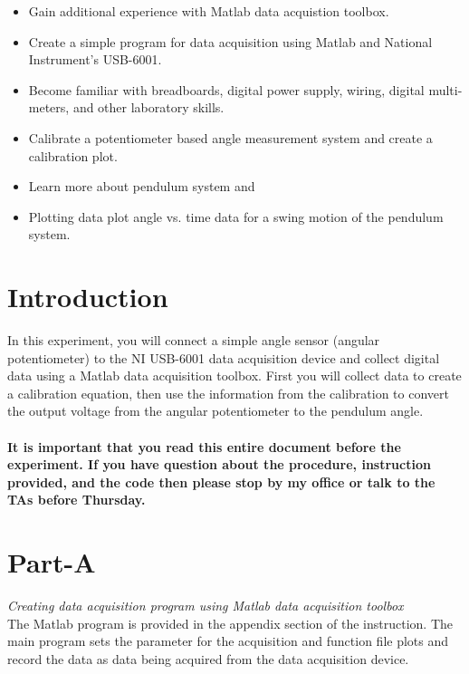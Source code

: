 \documentclass{article} %
\begin{document}
\begin{itemize}
\item Gain additional experience with Matlab data acquistion toolbox.
\item Create a simple program for data acquisition using Matlab and National Instrument’s USB-6001.
\item Become familiar with breadboards, digital power supply, wiring, digital multi-meters, and other laboratory skills.
\item Calibrate a potentiometer based angle measurement system and create a calibration plot.
\item Learn more about pendulum system and 
\item Plotting data plot angle vs. time data for a swing motion of the pendulum system.
\end{itemize}

\section{Introduction}
In this experiment, you will connect a simple angle sensor (angular potentiometer) to the NI USB-6001 data acquisition device and collect digital data using a Matlab data acquisition toolbox. First you will collect data to create a calibration equation, then use the information from the calibration to convert the output voltage from the angular potentiometer to the pendulum angle. \\ \\

\large {\textbf{It is important that you read this entire document before the experiment. If you have question about the procedure, instruction provided, and the code then please stop by my office or talk to the TAs before  Thursday. }}

\section{Part-A}
\emph{Creating data acquisition program using Matlab data acquisition toolbox}\\
The Matlab program is provided in the appendix section of the instruction. The main program sets the parameter for the acquisition and function file plots and record the data as data being acquired from the data acquisition device. 
\end{document}
